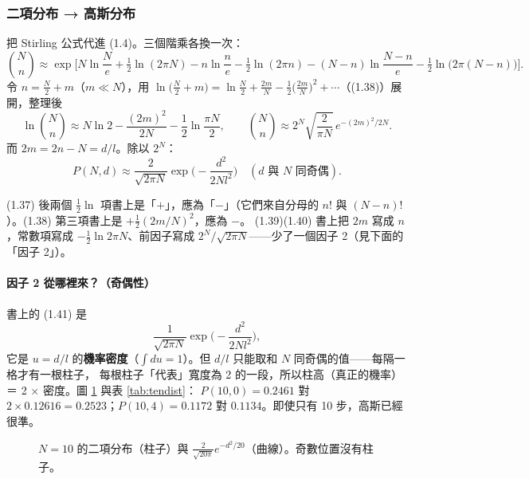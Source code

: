 \subsubsection*{二項分布 → 高斯分布}
把 Stirling 公式代進 (1.4)。三個階乘各換一次：
\begin{equation}
\binom Nn\approx\exp\Big[N\ln\frac Ne+\tfrac12\ln(2\pi N)-n\ln\frac ne-\tfrac12\ln(2\pi n)-(N-n)\ln\frac{N-n}e-\tfrac12\ln\big(2\pi(N-n)\big)\Big]. \tag{1.37}
\end{equation}
令 $n=\frac N2+m$（$m\ll N$），用 $\ln\big(\frac N2+m\big)=\ln\frac N2+\frac{2m}N-\frac12\big(\frac{2m}N\big)^2+\cdots$（(1.38)）展開，整理後
\begin{equation}
\ln\binom Nn\approx N\ln2-\frac{(2m)^2}{2N}-\frac12\ln\frac{\pi N}{2},\qquad
\binom Nn\approx 2^N\sqrt{\frac2{\pi N}}\,e^{-(2m)^2/2N}. \tag{1.39--1.40}
\end{equation}
而 $2m=2n-N=d/l$。除以 $2^N$：
\[
P(N,d)\approx\frac{2}{\sqrt{2\pi N}}\exp\Big(-\frac{d^2}{2Nl^2}\Big)\quad(d\text{ 與 }N\text{ 同奇偶}).
\]

\begin{errbox}[p.~12，(1.37)--(1.40)]
(1.37) 後兩個 $\tfrac12\ln$ 項書上是「$+$」，應為「$-$」（它們來自分母的 $n!$ 與 $(N-n)!$）。(1.38) 第三項書上是 $+\frac12(2m/N)^2$，應為 $-$。
(1.39)(1.40) 書上把 $2m$ 寫成 $n$，常數項寫成 $-\frac12\ln2\pi N$、前因子寫成 $2^N/\sqrt{2\pi N}$——少了一個因子 2（見下面的「因子 2」）。
\end{errbox}

\paragraph{因子 2 從哪裡來？（奇偶性）}
書上的 (1.41) 是
\begin{equation}
\frac1{\sqrt{2\pi N}}\exp\Big(-\frac{d^2}{2Nl^2}\Big), \tag{1.41}
\end{equation}
它是 $u=d/l$ 的\textbf{機率密度}（$\int du=1$）。但 $d/l$ 只能取和 $N$ 同奇偶的值——每隔一格才有一根柱子，
每根柱子「代表」寬度為 2 的一段，所以柱高（真正的機率）＝ 2 × 密度。圖 \ref{fig:binomgauss} 與表 \ref{tab:tendist}：
$P(10,0)=0.2461$ 對 $2\times0.12616=0.2523$；$P(10,4)=0.1172$ 對 $0.1134$。即使只有 10 步，高斯已經很準。

\begin{figure}[H]
\centering
\FigBinomGauss
\caption{$N=10$ 的二項分布（柱子）與 $\frac{2}{\sqrt{20\pi}}e^{-d^2/20}$（曲線）。奇數位置沒有柱子。}
\label{fig:binomgauss}
\end{figure}

